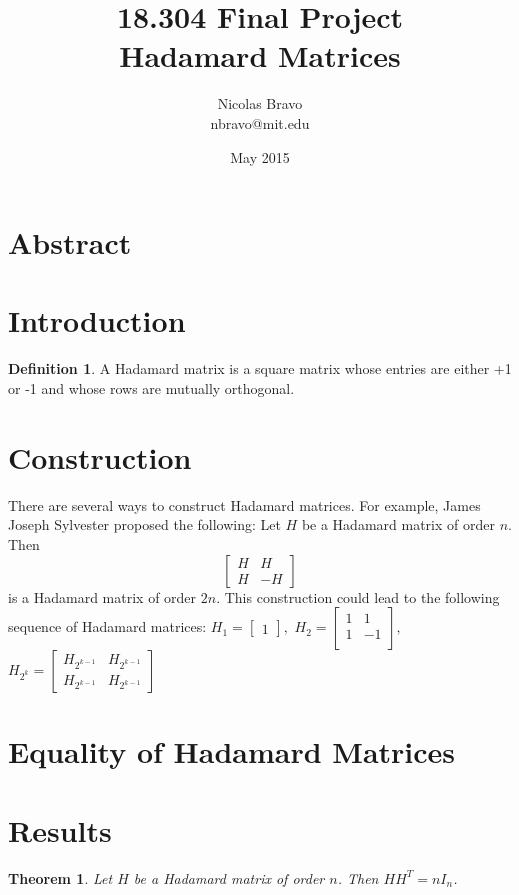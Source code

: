 \documentclass{article}
\title{18.304 Final Project \\  Hadamard Matrices}
\author{Nicolas Bravo \\ nbravo@mit.edu }
\date{May 2015}
\newtheorem{theorem}{Theorem}[section]
\theoremstyle{definition}
\newtheorem{definition}{Definition}[section]
\begin{document}
\maketitle

\section{Abstract}

\section{Introduction}

\begin{definition}
 A Hadamard matrix is a square matrix whose entries are either +1 or -1 and whose rows are mutually orthogonal.
\end{definition}

\section{Construction}
There are several ways to construct Hadamard matrices. For example, James Joseph Sylvester proposed the following: Let $H$ be a Hadamard matrix of order $n$. Then
\begin{equation*}
\begin{bmatrix}
H & H \\
H & -H
\end{bmatrix}
\end{equation*}
is a Hadamard matrix of order $2n$. This construction could lead to the following sequence of Hadamard matrices:
$H_1 =
\begin{bmatrix}
1
\end{bmatrix},
$
$H_2 =
\begin{bmatrix}
1 & 1 \\
1 & -1 \\
\end{bmatrix},
$
$H_{2^k} =
\begin{bmatrix}
H_{2^{k-1}} & H_{2^{k-1}} \\
H_{2^{k-1}} & H_{2^{k-1}}
\end{bmatrix}
$

\section{Equality of Hadamard Matrices}

\section{Results}
\begin{theorem}
Let $H$ be a Hadamard matrix of order $n$. Then $HH^T = nI_n$.
\end{theorem}
\end{document}

